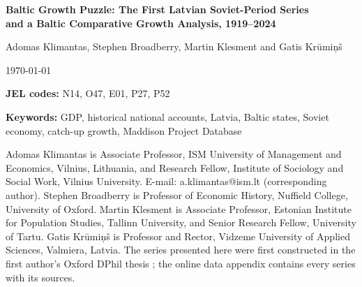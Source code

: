 \documentclass[12pt,a4paper]{article}
\begin{document}

\begin{titlepage}
    \begin{singlespace}
    \centering
    \vspace*{0.8cm}
    {\large\bfseries Baltic Growth Puzzle: The First Latvian Soviet-Period Series\\[0.3em]
    and a Baltic Comparative Growth Analysis, 1919--2024\par}
    \vspace{0.9cm}
    {\normalsize
    Adomas Klimantas, Stephen Broadberry, Martin Klesment and Gatis Kr\={u}mi\c{n}\v{s}\par}
    \vspace{0.5cm}
    {\small\today\par}
    \vspace{0.8cm}
    \begin{abstract}
        \noindent
        
    \end{abstract}
    \vspace{0.5cm}
    {\small\textbf{JEL codes:} N14, O47, E01, P27, P52\par}
    {\small\textbf{Keywords:} GDP, historical national accounts, Latvia, Baltic states, Soviet economy, catch-up growth, Maddison Project Database\par}
    \vfill
    \begin{flushleft}
    {\footnotesize\noindent Adomas Klimantas is Associate Professor, ISM University of Management and Economics, Vilnius, Lithuania, and Research Fellow, Institute of Sociology and Social Work, Vilnius University. E-mail: a.klimantas@ism.lt (corresponding author). Stephen Broadberry is Professor of Economic History, Nuffield College, University of Oxford. Martin Klesment is Associate Professor, Estonian Institute for Population Studies, Tallinn University, and Senior Research Fellow, University of Tartu. Gatis Kr\={u}mi\c{n}\v{s} is Professor and Rector, Vidzeme University of Applied Sciences, Valmiera, Latvia. The series presented here were first constructed in the first author's Oxford DPhil thesis \parencite{klimantas2025thesis}; the online data appendix contains every series with its sources.\par}
    \end{flushleft}
    \end{singlespace}
\end{titlepage}
\end{document}
